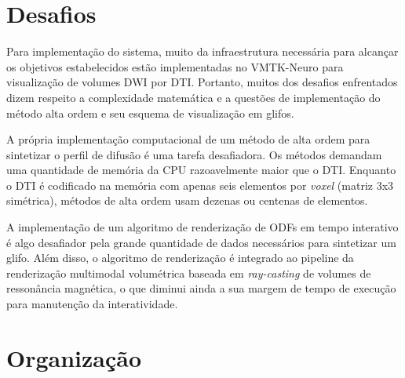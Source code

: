 \documentclass[
    12pt,                %
    oneside,            %
    a4paper,            %
    english,            %
    french,                %
    spanish,            %
    brazil                %
    ]{abntex2}
\begin{document}




\section{Desafios}
\label{sec::desafios}

Para implementação do sistema, muito da infraestrutura necessária para alcançar os objetivos estabelecidos estão implementadas no VMTK-Neuro para visualização de volumes DWI por DTI. Portanto, muitos dos desafios enfrentados dizem respeito a complexidade matemática e a questões de implementação do método alta ordem e seu esquema de visualização em glifos.

A própria implementação computacional de um método de alta ordem para sintetizar o perfil de difusão é uma tarefa desafiadora. Os métodos demandam uma quantidade de memória da CPU razoavelmente maior que o DTI. Enquanto o DTI é codificado na memória com apenas seis elementos por \textit{voxel} (matriz 3x3 simétrica), métodos de alta ordem usam dezenas ou centenas de elementos. %

A implementação de um algoritmo de renderização de ODFs em tempo interativo é algo desafiador pela grande quantidade de dados necessários para sintetizar um glifo. Além disso, o algoritmo de renderização é integrado ao pipeline da renderização multimodal volumétrica baseada em \textit{ray-casting} de volumes de ressonância magnética, o que diminui ainda a sua margem de tempo de execução para manutenção da interatividade.


\section{Organização}
\label{sec:intro_organizacao}
\end{document}
